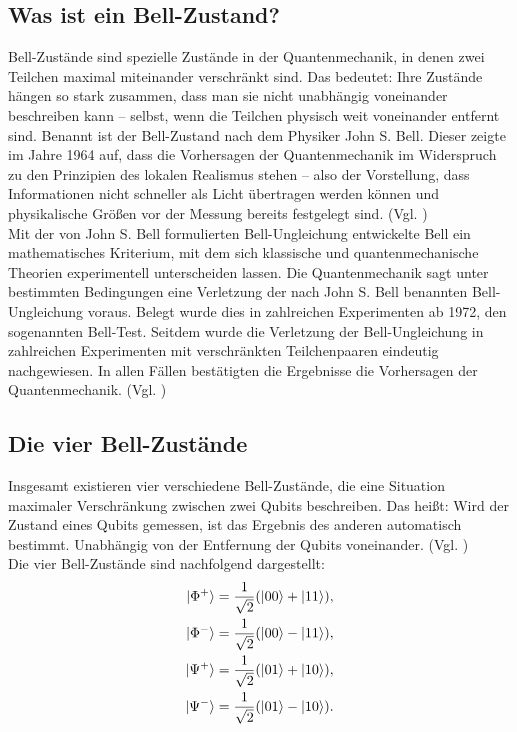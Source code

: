 \subsection{Was ist ein Bell-Zustand?}
Bell-Zustände sind spezielle Zustände in der Quantenmechanik, in denen zwei Teilchen maximal miteinander verschränkt sind. Das bedeutet: Ihre Zustände hängen so stark zusammen, dass man sie nicht unabhängig voneinander beschreiben kann – selbst, wenn die Teilchen physisch weit voneinander entfernt sind. Benannt ist der Bell-Zustand nach dem Physiker John S. Bell. Dieser zeigte im Jahre 1964 auf, dass die Vorhersagen der Quantenmechanik im Widerspruch zu den Prinzipien des lokalen Realismus stehen – also der Vorstellung, dass Informationen nicht schneller als Licht übertragen werden können und physikalische Größen vor der Messung bereits festgelegt sind. (Vgl. \cite[S.195]{bell_einstein_1964})
\\


Mit der von John S. Bell formulierten Bell-Ungleichung entwickelte Bell ein mathematisches Kriterium, mit dem sich klassische und quantenmechanische Theorien experimentell unterscheiden lassen. Die Quantenmechanik sagt unter bestimmten Bedingungen eine Verletzung der nach John S. Bell benannten Bell-Ungleichung voraus. Belegt wurde dies in zahlreichen Experimenten ab 1972, den sogenannten Bell-Test. Seitdem wurde die Verletzung der Bell-Ungleichung in zahlreichen Experimenten mit verschränkten Teilchenpaaren eindeutig nachgewiesen. In allen Fällen bestätigten die Ergebnisse die Vorhersagen der Quantenmechanik. 
(Vgl. \cite[S.53-59]{homeister_quantum_2022})

\subsection{Die vier Bell-Zustände}
Insgesamt existieren vier verschiedene Bell-Zustände, die eine Situation maximaler Verschränkung zwischen zwei Qubits beschreiben. Das heißt: Wird der Zustand eines Qubits gemessen, ist das Ergebnis des anderen automatisch bestimmt. Unabhängig von der Entfernung der Qubits voneinander. (Vgl. \cite[S.53-55]{homeister_quantum_2022}) 
\\


Die vier Bell-Zustände sind nachfolgend dargestellt: 
\[
\begin{aligned}
\ket{\Phi^+} &= \frac{1}{\sqrt{2}} (\ket{00} + \ket{11}), \\
\ket{\Phi^-} &= \frac{1}{\sqrt{2}} (\ket{00} - \ket{11}), \\
\ket{\Psi^+} &= \frac{1}{\sqrt{2}} (\ket{01} + \ket{10}), \\
\ket{\Psi^-} &= \frac{1}{\sqrt{2}} (\ket{01} - \ket{10}).
\end{aligned}
\]

